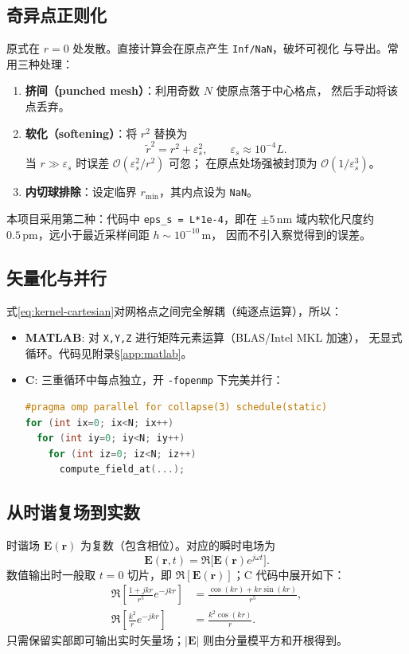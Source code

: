 \documentclass[11pt,a4paper]{article}
\newcommand{\eps}{\varepsilon}
\newcommand{\Evec}{\bm E}
\newcommand{\rvec}{\bm r}
\begin{document}
\subsection{奇异点正则化}\label{sec:reg}
原式在 $r=0$ 处发散。直接计算会在原点产生 \texttt{Inf/NaN}，破坏可视化
与导出。常用三种处理：
\begin{enumerate}
    \item \textbf{挤间（punched mesh）}：利用奇数 $N$ 使原点落于中心格点，
          然后手动将该点丢弃。
    \item \textbf{软化（softening）}：将 $r^{2}$ 替换为
    \begin{equation}
        \tilde r^{2} = r^{2}+\eps_{s}^{2},\qquad \eps_{s}\approx 10^{-4} L.
        \label{eq:soften}
    \end{equation}
    当 $r\gg\eps_{s}$ 时误差 $\mathcal O(\eps_{s}^{2}/r^{2})$ 可忽；
    在原点处场强被封顶为 $\mathcal O(1/\eps_{s}^{3})$。
    \item \textbf{内切球排除}：设定临界 $r_{\min}$，其内点设为 \texttt{NaN}。
\end{enumerate}
本项目采用第二种：代码中 \texttt{eps\_s = L*1e-4}，即在 $\pm 5\,\mathrm{nm}$ 
域内软化尺度约 $0.5\,\mathrm{pm}$，远小于最近采样间距 $h\sim 10^{-10}\,\mathrm{m}$，
因而不引入察觉得到的误差。

\subsection{矢量化与并行}
式\eqref{eq:kernel-cartesian}对网格点之间完全解耦（纯逐点运算），所以：
\begin{itemize}
    \item \textbf{MATLAB}: 对 \verb|X,Y,Z| 进行矩阵元素运算（BLAS/Intel MKL 加速），
          无显式循环。代码见附录\S\ref{app:matlab}。
    \item \textbf{C}: 三重循环中每点独立，开 \texttt{-fopenmp} 下完美并行：
\begin{lstlisting}[language=C]
#pragma omp parallel for collapse(3) schedule(static)
for (int ix=0; ix<N; ix++)
  for (int iy=0; iy<N; iy++)
    for (int iz=0; iz<N; iz++)
      compute_field_at(...);
\end{lstlisting}
\end{itemize}

\subsection{从时谐复场到实数}
时谐场 $\Evec(\rvec)$ 为复数（包含相位）。对应的瞬时电场为
\begin{equation}
    \Evec(\rvec,t) = \Re\!\bigl[\Evec(\rvec)e^{j\omega t}\bigr].
\end{equation}
数值输出时一般取 $t=0$ 切片，即 $\Re[\Evec(\rvec)]$；C 代码中展开如下：
\begin{align*}
    \Re\!\left[\frac{1+jkr}{r^{5}}e^{-jkr}\right]
        &= \frac{\cos(kr)+kr\sin(kr)}{r^{5}},\\
    \Re\!\left[\frac{k^{2}}{r}e^{-jkr}\right]
        &= \frac{k^{2}\cos(kr)}{r}.
\end{align*}
只需保留实部即可输出实时矢量场；$|\Evec|$ 则由分量模平方和开根得到。
\end{document}
